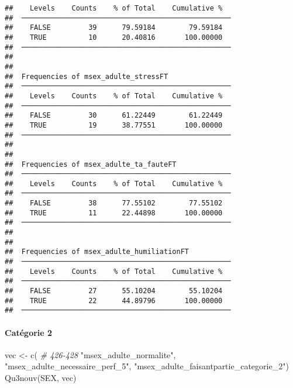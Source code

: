 \documentclass[
]{article}
\newenvironment{Shaded}{\begin{snugshade}}{\end{snugshade}}
\newcommand{\CommentTok}[1]{\textcolor[rgb]{0.56,0.35,0.01}{\textit{#1}}}
\newcommand{\FunctionTok}[1]{\textcolor[rgb]{0.00,0.00,0.00}{#1}}
\newcommand{\NormalTok}[1]{#1}
\newcommand{\OtherTok}[1]{\textcolor[rgb]{0.56,0.35,0.01}{#1}}
\newcommand{\StringTok}[1]{\textcolor[rgb]{0.31,0.60,0.02}{#1}}
\begin{document}
\begin{verbatim}
##    Levels    Counts    % of Total    Cumulative %   
##  ────────────────────────────────────────────────── 
##    FALSE         39      79.59184        79.59184   
##    TRUE          10      20.40816       100.00000   
##  ────────────────────────────────────────────────── 
## 
## 
##  Frequencies of msex_adulte_stressFT                
##  ────────────────────────────────────────────────── 
##    Levels    Counts    % of Total    Cumulative %   
##  ────────────────────────────────────────────────── 
##    FALSE         30      61.22449        61.22449   
##    TRUE          19      38.77551       100.00000   
##  ────────────────────────────────────────────────── 
## 
## 
##  Frequencies of msex_adulte_ta_fauteFT              
##  ────────────────────────────────────────────────── 
##    Levels    Counts    % of Total    Cumulative %   
##  ────────────────────────────────────────────────── 
##    FALSE         38      77.55102        77.55102   
##    TRUE          11      22.44898       100.00000   
##  ────────────────────────────────────────────────── 
## 
## 
##  Frequencies of msex_adulte_humiliationFT           
##  ────────────────────────────────────────────────── 
##    Levels    Counts    % of Total    Cumulative %   
##  ────────────────────────────────────────────────── 
##    FALSE         27      55.10204        55.10204   
##    TRUE          22      44.89796       100.00000   
##  ──────────────────────────────────────────────────
\end{verbatim}

\hypertarget{catuxe9gorie-2-4}{%
\paragraph{Catégorie 2}\label{catuxe9gorie-2-4}}

\begin{Shaded}
\begin{Highlighting}[]
\NormalTok{vec }\OtherTok{\textless{}{-}} \FunctionTok{c}\NormalTok{(  }\CommentTok{\# 426{-}428}
  \StringTok{"msex\_adulte\_normalite"}\NormalTok{,}
  \StringTok{"msex\_adulte\_necessaire\_perf\_5"}\NormalTok{,}
  \StringTok{"msex\_adulte\_faisantpartie\_categorie\_2"}\NormalTok{)}
\FunctionTok{Qu3nouv}\NormalTok{(SEX, vec)}
\end{Highlighting}
\end{Shaded}
\end{document}
